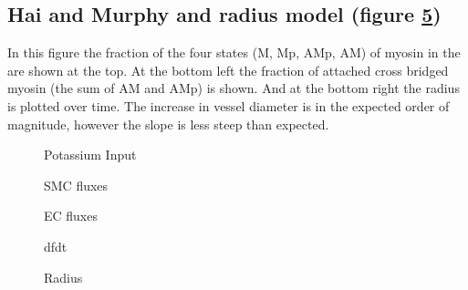 \subsection*{Hai and Murphy and radius model (figure \ref{fig:Radius})}
In this figure the fraction of the four states (M, Mp, AMp, AM) of myosin in the \cite{Hai1989} are shown at the top. At the bottom left the fraction of attached cross bridged myosin (the sum of AM and AMp) is shown. And at the bottom right the radius is plotted over time. The increase in vessel diameter is in the expected order of magnitude, however the slope is less steep than expected.

\begin{landscape} 
\begin{figure}[h!]
	\centering
	\tiny 
	\setlength\figureheight{2.5 cm} 
	\setlength\figurewidth{18 cm}
	
	\caption{Potassium Input}
	\label{fig:K}
\end{figure}

\begin{figure}[h!]
	\centering
	\tiny 
	\setlength\figureheight{2.5 cm} 
	\setlength\figurewidth{4 cm}
	
	\caption{SMC fluxes}
	\label{fig:SMCfluxes}
\end{figure}

\begin{figure}[h!]
	\centering
	\tiny 
	\setlength\figureheight{2.5 cm} 
	\setlength\figurewidth{3.7 cm}
	
	\caption{EC fluxes}
	\label{fig:ECfluxes}
\end{figure}

\begin{figure}[h!]
	\centering
	\tiny 
	\setlength\figureheight{2cm} 
	\setlength\figurewidth{9 cm}
	
	\caption{dfdt}
	\label{fig:dfdt}
\end{figure}

\begin{figure}[h!]
	\centering
	\tiny 
	\setlength\figureheight{3.5cm} 
	\setlength\figurewidth{9 cm}
	
	\caption{Radius}
	\label{fig:Radius}
\end{figure}
\end{landscape} 